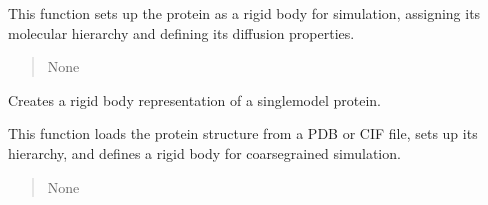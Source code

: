 \documentclass[letterpaper,10pt,english]{sphinxmanual}
\begin{document}
\begin{fulllineitems}
\begin{fulllineitems}
\sphinxAtStartPar
This function sets up the protein as a rigid body for simulation, assigning
its molecular hierarchy and defining its diffusion properties.
\begin{quote}\begin{description}
\sphinxAtStartPar
{}

\sphinxAtStartPar
None

\end{description}\end{quote}

\end{fulllineitems}


\begin{fulllineitems}
\label{\detokenize{src:src.Protein_Class.ProteinStructure.create_rigid_body_protein_singlemodel}}
\pysigstartsignatures
{}
\pysigstopsignatures
\sphinxAtStartPar
Creates a rigid body representation of a single\sphinxhyphen{}model protein.

\sphinxAtStartPar
This function loads the protein structure from a PDB or CIF file, sets up
its hierarchy, and defines a rigid body for coarse\sphinxhyphen{}grained simulation.
\begin{quote}\begin{description}
\sphinxAtStartPar
{}

\sphinxAtStartPar
None

\end{description}\end{quote}

\end{fulllineitems}


\begin{fulllineitems}
\label{\detokenize{src:src.Protein_Class.ProteinStructure.get_current_localization}}
\pysigstartsignatures
{}
\pysigstopsignatures
\end{fulllineitems}


\end{fulllineitems}
\end{document}
